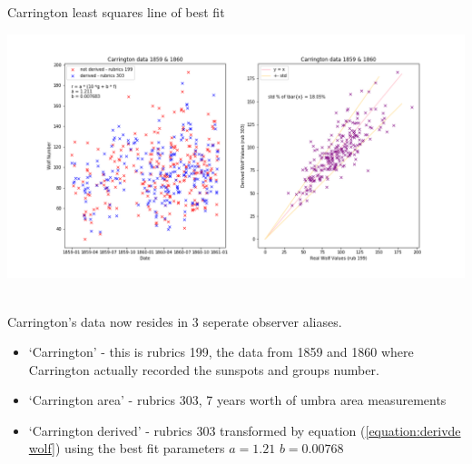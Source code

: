 \documentclass[12pt]{article}
\begin{document}
{\centering
    \caption{Carrington least squares line of best fit}
    \includegraphics[width=\linewidth]{carrington_fit_wolf.png}
    \label{figure:carrington fit wolf}
\par}\\

Carrington's data now resides in 3 seperate observer aliases.
\begin{itemize}
    \item `Carrington' - this is rubrics 199, the data from 1859 and 1860 where Carrington actually recorded the sunspots and groups number.
    \item `Carrington area' - rubrics 303, 7 years worth of umbra area measurements
    \item `Carrington derived' - rubrics 303 transformed by equation (\ref{equation:derivde wolf}) using the best fit parameters $a=1.21$ $b=0.00768$
\end{itemize}

\newpage
\end{document}
